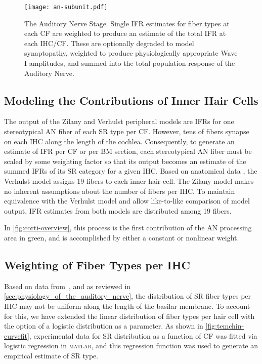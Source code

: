 \begin{figure}[htbp]
	\centering
	\texttt{[image: an-subunit.pdf]}
	\caption[The Auditory Nerve Stage]{The Auditory Nerve Stage. Single IFR estimates for fiber types at each CF are weighted to produce an estimate of the total IFR at each IHC/CF.  These are optionally degraded to model synaptopathy, weighted to produce physiologically appropriate Wave I amplitudes, and summed into the total population response of the Auditory Nerve.}
	\label{fig:an-subunit}
\end{figure}

\subsection{Modeling the Contributions of Inner Hair Cells} %
\label{sub:contributions_to_the_response_by_inner_hair_cells}
The output of the Zilany and Verhulst peripheral models are IFRs for one stereotypical AN fiber of each SR type per CF.   However, tens of fibers synapse on each IHC along the length of the cochlea.  Consequently, to generate an estimate of IFR per CF or per BM section, each stereotypical AN fiber must be scaled by some weighting factor so that its output becomes an estimate of the summed IFRs of its SR category for a given IHC.  Based on anatomical data \citep{Liberman1978AuditoryNerve}, the Verhulst model assigns 19 fibers to each inner hair cell.  The Zilany model makes no inherent assumptions about the number of fibers per IHC. To maintain equivalence with the Verhulst model and allow like-to-like comparison of model output, IFR estimates from both models are distributed among 19 fibers.

In \autoref{fig:corti-overview}, this process is the first contribution of the AN processing area in green, and is accomplished by either a constant or nonlinear weight.



\subsection{Weighting of Fiber Types per IHC} %
\label{sub:weighting_of_fiber_types_per_ihc}
Based on data from~\cite{Temchin2008Threshold}, and as reviewed in \autoref{sec:physiology_of_the_auditory_nerve}, the distribution of SR fiber types per IHC may not be uniform along the length of the basilar membrane.  To account for this, we have extended the linear distribution of fiber types per hair cell with the option of a logistic distribution as a parameter.   As shown in \autoref{fig:temchin-curvefit}, experimental data for SR distribution as a function of CF was fitted via logistic regression in \textsc{matlab}, and this regression function was used to generate an empirical estimate of SR type. 

